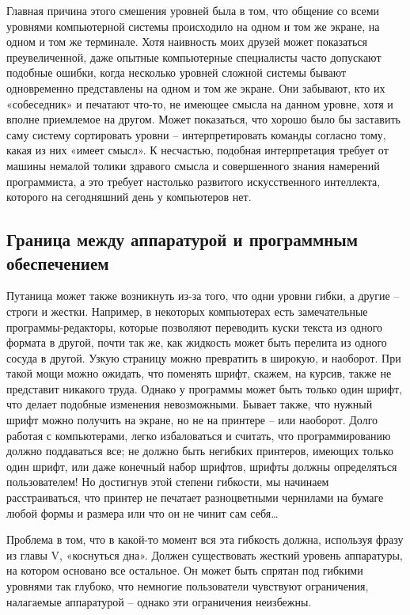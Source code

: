 \documentclass[../main.tex]{subfiles}
\begin{document}
Главная причина этого смешения уровней была в том, что общение со всеми уровнями компьютерной системы происходило на одном и том же экране, на одном и том же терминале. Хотя наивность моих друзей может показаться преувеличенной, даже опытные компьютерные специалисты часто допускают подобные ошибки, когда несколько уровней сложной системы бывают одновременно представлены на одном и том же экране. Они забывают, кто их «собеседник» и печатают что-то, не имеющее смысла на данном уровне, хотя и вполне приемлемое на другом. Может показаться, что хорошо было бы заставить саму систему сортировать уровни \--- интерпретировать команды согласно тому, какая из них «имеет смысл». К несчастью, подобная интерпретация требует от машины немалой толики здравого смысла и совершенного знания намерений программиста, а это требует настолько развитого искусственного интеллекта, которого на сегодняшний день у компьютеров нет.


\subsection{Граница между аппаратурой и программным обеспечением}

Путаница может также возникнуть из-за того, что одни уровни гибки, а другие \--- строги и жестки. Например, в некоторых компьютерах есть замечательные программы-редакторы, которые позволяют переводить куски текста из одного формата в другой, почти так же, как жидкость может быть перелита из одного сосуда в другой. Узкую страницу можно превратить в широкую, и наоборот. При такой мощи можно ожидать, что поменять шрифт, скажем, на курсив, также не представит никакого труда. Однако у программы может быть только один шрифт, что делает подобные изменения невозможными. Бывает также, что нужный шрифт можно получить на экране, но не на принтере \--- или наоборот. Долго работая с компьютерами, легко избаловаться и считать, что программированию должно поддаваться все; не должно быть негибких принтеров, имеющих только один шрифт, или даже конечный набор шрифтов, шрифты должны определяться пользователем! Но достигнув этой степени гибкости, мы начинаем расстраиваться, что принтер не печатает разноцветными чернилами на бумаге любой формы и размера или что он не чинит сам себя\ldots{}

Проблема в том, что в какой-то момент вся эта гибкость должна, используя фразу из главы V, «коснуться дна». Должен существовать жесткий уровень аппаратуры, на котором основано все остальное. Он может быть спрятан под гибкими уровнями так глубоко, что немногие пользователи чувствуют ограничения, налагаемые аппаратурой \--- однако эти ограничения неизбежны.
\end{document}
